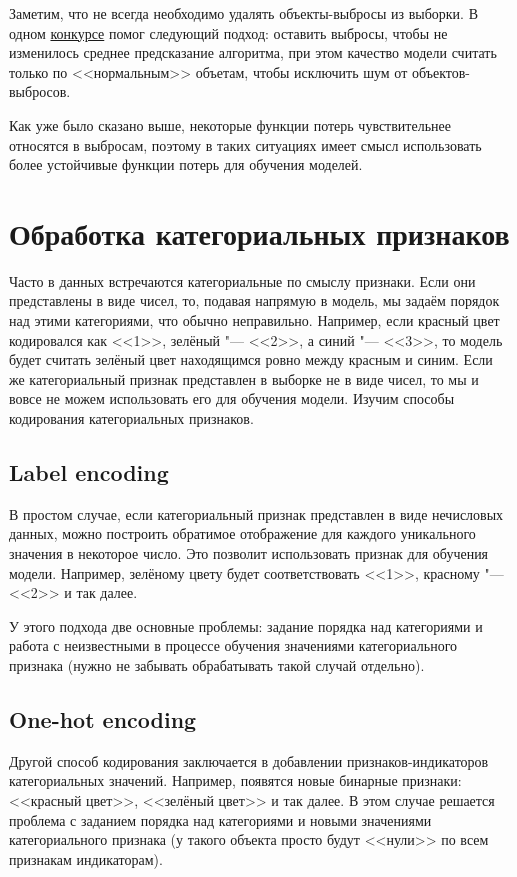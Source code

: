 \documentclass[12pt,fleqn]{article}
\begin{document}
Заметим, что не всегда необходимо удалять объекты-выбросы из выборки. В одном \href{https://habr.com/company/ods/blog/336168/}{конкурсе} помог следующий подход: оставить выбросы, чтобы не изменилось среднее предсказание алгоритма, при этом качество модели считать только по <<нормальным>> объетам, чтобы исключить шум от объектов-выбросов.

Как уже было сказано выше, некоторые функции потерь чувствительнее относятся в выбросам, поэтому в таких ситуациях имеет смысл использовать более устойчивые функции потерь для обучения моделей.

\section{Обработка категориальных признаков}

Часто в данных встречаются категориальные по смыслу признаки. Если они представлены в виде чисел, то, подавая напрямую в модель, мы задаём порядок над этими категориями, что обычно неправильно. Например, если красный цвет кодировался как <<1>>, зелёный "--- <<2>>, а синий "--- <<3>>, то модель будет считать зелёный цвет находящимся ровно между красным и синим. Если же категориальный признак представлен в выборке не в виде чисел, то мы и вовсе не можем использовать его для обучения модели. Изучим способы кодирования категориальных признаков.

\subsection{Label encoding}

В простом случае, если категориальный признак представлен в виде нечисловых данных, можно построить обратимое отображение для каждого уникального значения в некоторое число. Это позволит использовать признак для обучения модели. Например, зелёному цвету будет соответствовать <<1>>, красному "--- <<2>> и так далее.

У этого подхода две основные проблемы: задание порядка над категориями и работа с неизвестными в процессе обучения значениями категориального признака (нужно не забывать обрабатывать такой случай отдельно).

\subsection{One-hot encoding}

Другой способ кодирования заключается в добавлении признаков-индикаторов категориальных значений. Например, появятся новые бинарные признаки: <<красный цвет>>, <<зелёный цвет>> и так далее. В этом случае решается проблема с заданием порядка над категориями и новыми значениями категориального признака (у такого объекта просто будут <<нули>> по всем признакам индикаторам).
\end{document}
